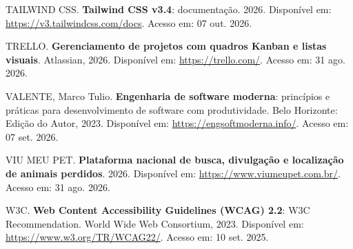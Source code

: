 \begin{flushleft}
\vspace{12pt}
\noindent TAILWIND CSS. \textbf{Tailwind CSS v3.4}: documentação. 2026. Disponível em: \url{https://v3.tailwindcss.com/docs}. Acesso em: 07 out. 2026.

\vspace{12pt}
\noindent TRELLO. \textbf{Gerenciamento de projetos com quadros Kanban e listas visuais}. Atlassian, 2026. Disponível em: \url{https://trello.com/}. Acesso em: 31 ago. 2026.

\vspace{12pt}
\vspace{12pt}
\noindent VALENTE, Marco Tulio. \textbf{Engenharia de software moderna}: princípios e práticas para desenvolvimento de software com produtividade. Belo Horizonte: Edição do Autor, 2023. Disponível em: \url{https://engsoftmoderna.info/}. Acesso em: 07 set. 2026.

\vspace{12pt}
\noindent VIU MEU PET. \textbf{Plataforma nacional de busca, divulgação e localização de animais perdidos}. 2026. Disponível em: \url{https://www.viumeupet.com.br/}. Acesso em: 31 ago. 2026.

\vspace{12pt}
\noindent W3C. \textbf{Web Content Accessibility Guidelines (WCAG) 2.2}: W3C Recommendation. World Wide Web Consortium, 2023. Disponível em: \url{https://www.w3.org/TR/WCAG22/}. Acesso em: 10 set. 2025.

\end{flushleft}
\clearpage
